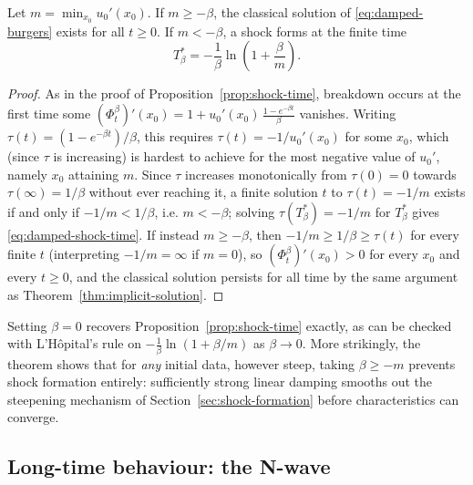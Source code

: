 \begin{theorem}
\label{thm:damped-shock-threshold}
Let $m = \min_{x_0} u_0'(x_0)$. If $m \geq -\beta$, the classical solution
of \eqref{eq:damped-burgers} exists for all $t \geq 0$. If $m < -\beta$,
a shock forms at the finite time
\begin{equation}
  \label{eq:damped-shock-time}
  T^*_\beta = -\frac{1}{\beta} \ln\!\left(1 + \frac{\beta}{m}\right).
\end{equation}
\end{theorem}

\begin{proof}
As in the proof of Proposition~\ref{prop:shock-time}, breakdown occurs at
the first time some $(\Phi_t^\beta)'(x_0) = 1 + u_0'(x_0)\,
\frac{1-e^{-\beta t}}{\beta}$ vanishes. Writing $\tau(t) =
(1-e^{-\beta t})/\beta$, this requires $\tau(t) = -1/u_0'(x_0)$ for some
$x_0$, which (since $\tau$ is increasing) is hardest to achieve for the
most negative value of $u_0'$, namely $x_0$ attaining $m$. Since $\tau$
increases monotonically from $\tau(0)=0$ towards $\tau(\infty) =
1/\beta$ without ever reaching it, a finite solution $t$ to $\tau(t) =
-1/m$ exists if and only if $-1/m < 1/\beta$, i.e. $m < -\beta$; solving
$\tau(T_\beta^*) = -1/m$ for $T_\beta^*$ gives
\eqref{eq:damped-shock-time}. If instead $m \geq -\beta$, then $-1/m \geq
1/\beta \geq \tau(t)$ for every finite $t$ (interpreting $-1/m=\infty$ if
$m=0$), so $(\Phi_t^\beta)'(x_0) > 0$ for every $x_0$ and every $t\geq0$,
and the classical solution persists for all time by the same argument as
Theorem~\ref{thm:implicit-solution}.
\end{proof}

\begin{remark}
Setting $\beta=0$ recovers Proposition~\ref{prop:shock-time} exactly, as
can be checked with L'H\^opital's rule on $-\frac1\beta\ln(1+\beta/m)$
as $\beta\to0$. More strikingly, the theorem shows that for \emph{any}
initial data, however steep, taking $\beta\geq -m$ prevents shock
formation entirely: sufficiently strong linear damping smooths out the
steepening mechanism of Section~\ref{sec:shock-formation} before
characteristics can converge.
\end{remark}

\subsection{Long-time behaviour: the N-wave}
\label{subsec:n-wave}

